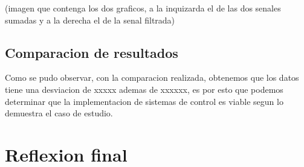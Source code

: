 (imagen que contenga los dos graficos, a la inquizarda el de las dos senales sumadas y a la derecha el de la senal filtrada)

\subsection{Comparacion de resultados}

Como se pudo observar, con la comparacion realizada, obtenemos que los datos tiene una desviacion de xxxxx ademas de xxxxxx, es por esto que podemos determinar que la implementacion de sistemas de control es viable segun lo demuestra el caso de estudio.


\section{Reflexion final}